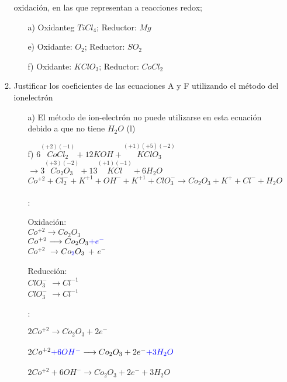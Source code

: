 \documentclass[../Práctica.root.tex]{subfiles}
\newcommand{\lra}{\ensuremath{\longrightarrow{}}}
\newcommand{\sr}[2]{\stackrel{#1}{#2}}
\begin{document}
\begin{enumerate}
\begin{enumerate}
                    oxidación, en las que representan a reacciones redox;
                    \begin{enumerate}
                        \item[a)] Oxidanteg $TiCl_4$; Reductor: $Mg$
                        \item[e)] Oxidante: $O_2$; Reductor: $SO_2$
                        \item[f)] Oxidante: $KClO_3$; Reductor: $CoCl_2$
                    \end{enumerate}
              \item Justificar los coeficientes de las ecuaciones A y F utilizando el método del ionelectrón
                    \begin{itemize}
                        \item[a)] El método de ion-electrón no puede utilizarse en esta ecuación debido a que no tiene $H_2O$ (l)
                        \item[f)] $6 \sr{(+2)(-1)}{CoCl_2} + 12 KOH + \sr{(+1)(+5)(-2)}{KClO_3}$
                              $\lra 3 \sr{(+3)(-2)}{Co_2O_3} + 13 \sr{(+1)(-1)}{KCl} + 6 H_2O$ \\
                              $Co^{+2} + Cl_2^- + K^{+1} + OH^- + K^{+1} + ClO_3^- \lra Co_2O_3 + K^+ + Cl^- + H_2O$ \\ \\
                              :
                              \begin{multicols}{2}
                                  Oxidación: \\
                                  $Co^{+2} \lra Co_2O_3$ \\
                                  $Co^{+2} \lra Co_2O_3 \blue{+ e^-}$ \\
                                   $Co^{+2}$ \lra $Co\textcolor{blue}{_2}O_3$ +  $e^-$

                                  \columnbreak

                                  Reducción: \\
                                  $ClO_3^-$ \lra $Cl^{-1}$ \\
                                  $ClO_3^-$  \lra $Cl^{-1}$
                              \end{multicols}
                              :
                              \begin{multicols}{2}
                                  $2 Co^{+2} \lra Co_2O_3 + 2 e^-$ \\
                                   \\
                                  $2 Co^{+2} \blue{+ 6 OH^-} \lra Co_2O_3 + 2 e^- \blue{+ 3 H_2O}$ \\
                                   \\
                                  $2 Co^{+2} + 6 OH^- \lra Co_2O_3 + 2 e^- + 3 H_2O$


\end{multicols}
\end{itemize}
\end{enumerate}
\end{enumerate}
\end{document}
